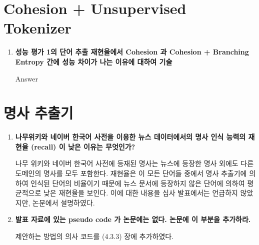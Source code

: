 \documentclass[11pt]{article}
\begin{document}
\section{Cohesion + Unsupervised Tokenizer}
\begin{enumerate}
\item \textbf{성능 평가 1의 단어 추출 재현율에서 Cohesion 과 Cohesion + Branching Entropy 간에 성능 차이가 나는 이유에 대하여 기술}

Answer

\end{enumerate}



\section{명사 추출기}
\begin{enumerate}
\item \textbf{나무위키와 네이버 한국어 사전을 이용한 뉴스 데이터에서의 명사 인식 능력의 재현율 (recall) 이 낮은 이유는 무엇인가?}

나무 위키와 네이버 한국어 사전에 등재된 명사는 뉴스에 등장한 명사 외에도 다른 도메인의 명사를 모두 포함한다.
재현율은 이 모든 단어들 중에서 명사 추출기에 의하여 인식된 단어의 비율이기 때문에 뉴스 문서에 등장하지 않은 단어에 의하여 평균적으로 낮은 재현율을 보인다. 
이에 대한 내용을 심사 발표에서는 언급하지 않았지만, 논문에서 설명하였다.


\item \textbf{발표 자료에 있는 pseudo code 가 논문에는 없다. 논문에 이 부분을 추가하라.}

제안하는 방법의 의사 코드를 (4.3.3) 장에 추가하였다.

\end{enumerate}
\end{document}
